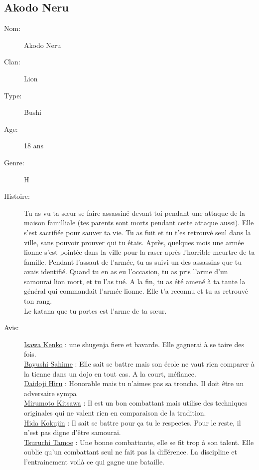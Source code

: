 \documentclass[oneside,12pt]{book}
\begin{document}
\begin{flushleft}
\clearpage

\section{Akodo Neru}
\begin{description}
\item[Nom:]{Akodo Neru}
\item[Clan:]{Lion}
\item[Type:]{Bushi}
\item[Age:]{18 ans}
\item[Genre:]{H}
\item[Histoire:]{
Tu as vu ta sœur se faire assassiné devant toi pendant une attaque de la maison familliale (tes parents sont morts pendant cette attaque aussi).
Elle s'est sacrifiée pour sauver ta vie. Tu as fuit et tu t'es retrouvé seul dans la ville, sans pouvoir prouver qui tu étais. 
Après, quelques mois une armée lionne s'est pointée dans la ville pour la raser après l'horrible meurtre de ta famille. Pendant l'assaut de l'armée, tu as suivi un des assassins que tu avais identifié. Quand tu en as eu l'occasion, tu as pris l'arme d'un samourai lion mort, et tu l'as tué.
A la fin, tu as été amené à ta tante la général qui commandait l'armée lionne. Elle t'a reconnu et tu as retrouvé ton rang.\\
Le katana que tu portes est l'arme de ta sœur. 
\vspace{0.2cm}
}
\item[Avis:]{
\underline{Isawa Kenko} : une shugenja fiere et bavarde. Elle gagnerai à se taire des fois.\\
\underline{Bayushi Sahime} : Elle sait se battre mais son école ne vaut rien comparer à la tienne dans un dojo en tout cas. A la court, méfiance.\\
\underline{Daidoji Hiru} : Honorable mais tu n'aimes pas sa tronche. Il doit être un adversaire sympa\\
\underline{Mirumoto Kitsawa} : Il est un bon combattant mais utilise des techniques originales qui ne valent rien en comparaison de la tradition. \\
\underline{Hida Kokujin} : Il sait se battre pour ça tu le respectes. Pour le reste, il n'est pas digne d'être samourai. \\
\underline{Tsuruchi Tamoe} : Une bonne combattante, elle se fit trop à son talent. Elle oublie qu'un combattant seul ne fait pas la différence. La discipline et l'entrainement voilà ce qui gagne une bataille. \\
}
\end{description}
\end{flushleft}
\end{document}
